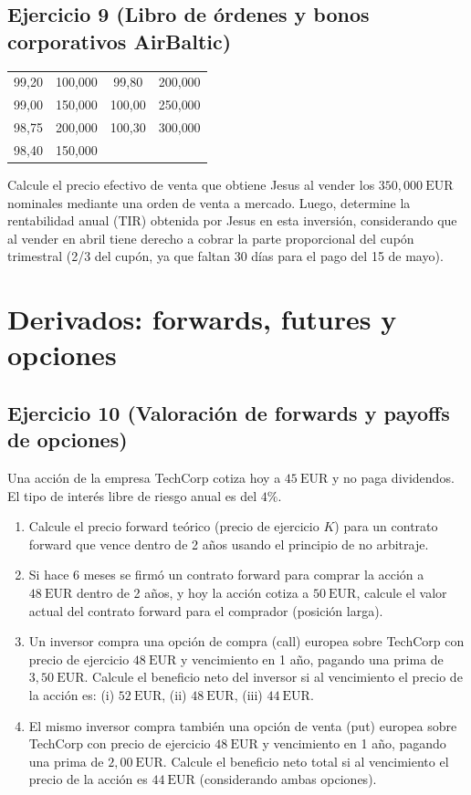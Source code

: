 \documentclass[12pt,a4paper]{article}
\newcommand{\EUR}[1]{\ensuremath{#1~\text{EUR}}}
\newenvironment{ejercicio}[1]{\subsection*{Ejercicio #1}}{}
\begin{document}
\begin{ejercicio}{9 (Libro de órdenes y bonos corporativos AirBaltic)}
\begin{enumerate}[label=\alph*)]
\begin{center}
\begin{tabular}{cc|cc}
  \midrule
  99{,}20 & 100{,}000 & 99{,}80 & 200{,}000\\
  99{,}00 & 150{,}000 & 100{,}00 & 250{,}000\\
  98{,}75 & 200{,}000 & 100{,}30 & 300{,}000\\
  98{,}40 & 150{,}000 &         &          \\
  \bottomrule
  \end{tabular}
  \end{center}
  Calcule el precio efectivo de venta que obtiene Jesus al vender los \EUR{350{,}000} nominales mediante una orden de venta a mercado. Luego, determine la rentabilidad anual (TIR) obtenida por Jesus en esta inversión, considerando que al vender en abril tiene derecho a cobrar la parte proporcional del cupón trimestral (2/3 del cupón, ya que faltan 30 días para el pago del 15 de mayo).
\end{enumerate}
\end{ejercicio}

\section{Derivados: forwards, futures y opciones}

\begin{ejercicio}{10 (Valoración de forwards y payoffs de opciones)}
Una acción de la empresa TechCorp cotiza hoy a \EUR{45} y no paga dividendos. El tipo de interés libre de riesgo anual es del \(4\%\).
\begin{enumerate}[label=\alph*)]
  \item Calcule el precio forward teórico (precio de ejercicio \(K\)) para un contrato forward que vence dentro de 2 años usando el principio de no arbitraje.
  \item Si hace 6 meses se firmó un contrato forward para comprar la acción a \EUR{48} dentro de 2 años, y hoy la acción cotiza a \EUR{50}, calcule el valor actual del contrato forward para el comprador (posición larga).
  \item Un inversor compra una opción de compra (call) europea sobre TechCorp con precio de ejercicio \EUR{48} y vencimiento en 1 año, pagando una prima de \EUR{3{,}50}. Calcule el beneficio neto del inversor si al vencimiento el precio de la acción es: (i) \EUR{52}, (ii) \EUR{48}, (iii) \EUR{44}.
  \item El mismo inversor compra también una opción de venta (put) europea sobre TechCorp con precio de ejercicio \EUR{48} y vencimiento en 1 año, pagando una prima de \EUR{2{,}00}. Calcule el beneficio neto total si al vencimiento el precio de la acción es \EUR{44} (considerando ambas opciones).
\end{enumerate}
\end{ejercicio}
\end{document}
